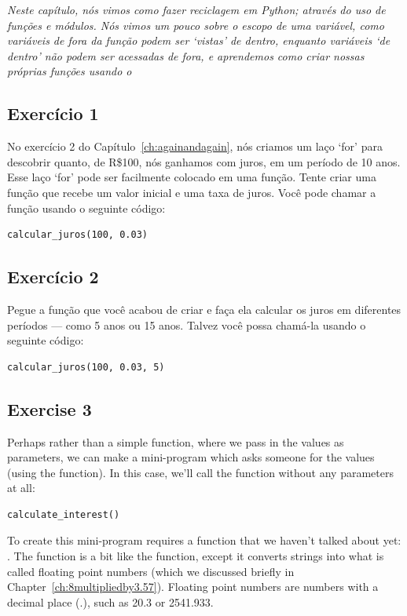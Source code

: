 \emph{Neste capítulo, nós vimos como fazer reciclagem em Python; através do uso de funções e módulos. Nós vimos um pouco sobre o escopo de uma variável, como variáveis de fora da função podem ser `vistas' de dentro, enquanto variáveis `de dentro' não podem ser acessadas de fora, e aprendemos como criar nossas próprias funções usando o }

\subsection*{Exercício 1}
No exercício 2 do Capítulo~\ref{ch:againandagain}, nós criamos um laço `for' para descobrir quanto, de R\$100, nós ganhamos com juros, em um período de 10 anos. Esse laço `for' pode ser facilmente colocado em uma função. Tente criar uma função que recebe um valor inicial e uma taxa de juros. Você pode chamar a função usando o seguinte código:

\begin{listing}
\begin{verbatim}
calcular_juros(100, 0.03)
\end{verbatim}
\end{listing}

\subsection*{Exercício 2}
Pegue a função que você acabou de criar e faça ela calcular os juros em diferentes períodos --- como 5 anos ou 15 anos. Talvez você possa chamá-la usando o seguinte código:

\begin{listing}
\begin{verbatim}
calcular_juros(100, 0.03, 5)
\end{verbatim}
\end{listing}

\subsection*{Exercise 3}
Perhaps rather than a simple function, where we pass in the values as parameters, we can make a mini-program which asks someone for the values (using the  function).  In this case, we'll call the function without any parameters at all:

\begin{listing}
\begin{verbatim}
calculate_interest()
\end{verbatim}
\end{listing}

\noindent
To create this mini-program requires a function that we haven't talked about yet: . The  function is a bit like the  function, except it converts strings into what is called floating point numbers (which we discussed briefly in Chapter~\ref{ch:8multipliedby3.57}).  Floating point numbers are numbers with a decimal place (.), such as 20.3 or 2541.933.

\newpage

